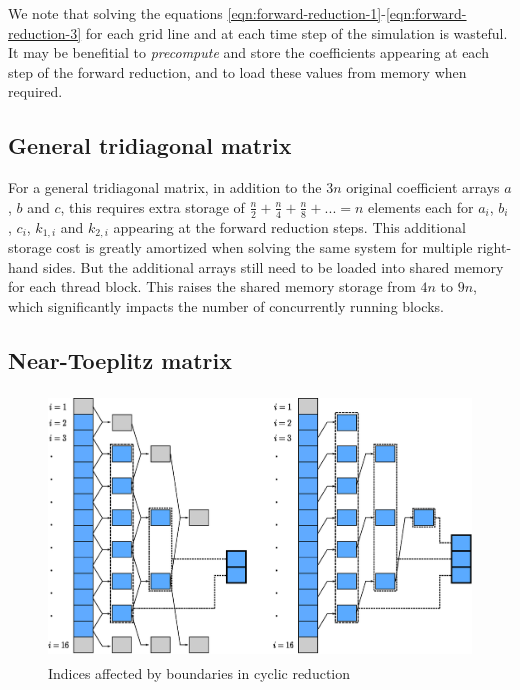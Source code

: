 \documentclass{elsarticle}
\begin{document}
We note that solving the equations
\ref{eqn:forward-reduction-1}-\ref{eqn:forward-reduction-3}
for each grid line and at each time step of the simulation
is wasteful.
It may be benefitial to
\emph{precompute} and store the coefficients appearing at
each step of the forward reduction,
and to load these values from memory when required.

\subsection{General tridiagonal matrix}

For a general tridiagonal matrix,
in addition to the $3n$ original coefficient arrays
$a$, $b$ and $c$,
this requires extra storage of 
$\frac{n}{2}+\frac{n}{4}+\frac{n}{8}+...=n$
elements each
for $a_i$, $b_i$, $c_i$, $k_{1,i}$ and $k_{2,i}$
appearing at the forward reduction steps.
This additional storage cost is greatly amortized
when solving the same system for multiple right-hand sides.
But the additional arrays
still need to be loaded into shared memory for each thread block.
This raises the shared memory storage from $4n$ to $9n$,
which significantly impacts the number of
concurrently running blocks.

\subsection{Near-Toeplitz matrix}

\begin{figure}[h!]
\begin{center}
\includegraphics[height=200pt]{img/cyclic-reduction-boundaries.eps}
\end{center}
\caption{Indices affected by boundaries in cyclic reduction}
\label{fig:cyclic-reduction-boundaries}
\end{figure}
\end{document}
